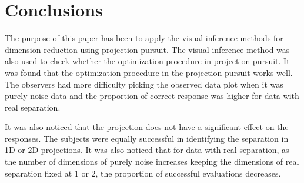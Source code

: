 \documentclass[12]{article}
\begin{document}
%
% 
%
%

\section{Conclusions}
The purpose of this paper has been to apply the visual inference methods for dimension reduction using projection pursuit. The visual inference method was also used to check whether the optimization procedure in projection pursuit. It was found that the optimization procedure in the projection pursuit works well. The observers had more difficulty picking the observed data plot when it was purely noise data and the proportion of correct response was higher for data with real separation. 

It was also noticed that the projection does not have a significant effect on the responses. The subjects were equally successful in identifying the separation in 1D or 2D projections. It was also noticed that for data with real separation, as the number of dimensions of purely noise increases keeping the dimensions of real separation fixed at 1 or 2, the proportion of successful evaluations decreases. 
\end{document}
